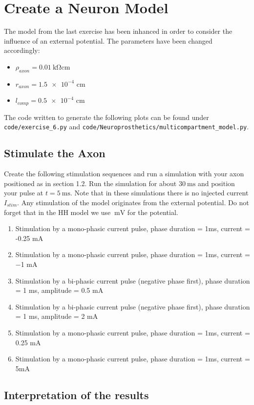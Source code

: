 \documentclass{scrartcl}			%
\begin{document}
\section{Create a Neuron Model}

The model from the last exercise has been inhanced in order to consider the influence of an external potential. The parameters have been changed accordingly:
\begin{itemize}
\item $\rho_{axon} = \SI{0.01}{\kilo\ohm}\text{cm}$
\item $r_{axon} = \num{1.5e-4}$ cm
\item $l_{comp} = \num{0.5e-4}$ cm
\end{itemize}
The code written to generate the following plots can be found under \texttt{code/exercise\_6.py} and \texttt{code/Neuroprosthetics/multicompartment\_model.py}.

\subsection{Stimulate the Axon}
Create the following stimulation sequences and run a simulation with your axon positioned as in section 1.2. Run the simulation for about $\SI{30}{\milli\second}$ and position your pulse at $t = \SI{5}{\milli\second}$. Note that in these simulations there is no injected current $I_{stim}$. Any stimulation of the model originates from the external potential.
Do not forget that in the HH model we use $\SI{}{\milli\volt}$ for the potential.

\begin{enumerate}
\item Stimulation by a mono-phasic current pulse, phase duration = 1ms, current =
-0.25 mA
\item Stimulation by a mono-phasic current pulse, phase duration = 1ms, current =
−1 mA
\item Stimulation by a bi-phasic current pulse (negative phase first), phase duration =
1 ms, amplitude = 0.5 mA
\item Stimulation by a bi-phasic current pulse (negative phase first), phase duration =
1 ms, amplitude = 2 mA
\item Stimulation by a mono-phasic current pulse, phase duration = 1ms, current =
0.25 mA
\item Stimulation by a mono-phasic current pulse, phase duration = 1ms, current =
   5mA
\end{enumerate}

\subsection{Interpretation of the results}
\end{document}
